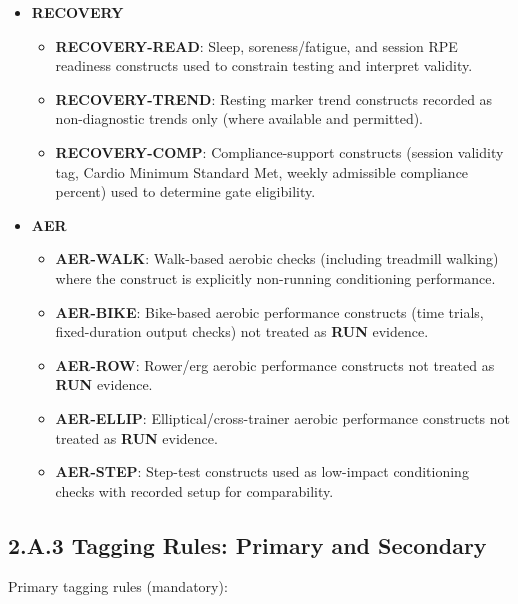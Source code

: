\documentclass[10pt]{article}
\begin{document}
\begin{itemize}
\item \textbf{RECOVERY}

  \begin{itemize}
  \item \textbf{RECOVERY-READ}: Sleep, soreness/fatigue, and session RPE readiness constructs used to constrain testing and interpret validity.
  \item \textbf{RECOVERY-TREND}: Resting marker trend constructs recorded as non-diagnostic trends only (where available and permitted).
  \item \textbf{RECOVERY-COMP}: Compliance-support constructs (session validity tag, Cardio Minimum Standard Met, weekly admissible compliance percent) used to determine gate eligibility.
  \end{itemize}

\item \textbf{AER}

  \begin{itemize}
  \item \textbf{AER-WALK}: Walk-based aerobic checks (including treadmill walking) where the construct is explicitly non-running conditioning performance.
  \item \textbf{AER-BIKE}: Bike-based aerobic performance constructs (time trials, fixed-duration output checks) not treated as \textbf{RUN} evidence.
  \item \textbf{AER-ROW}: Rower/erg aerobic performance constructs not treated as \textbf{RUN} evidence.
  \item \textbf{AER-ELLIP}: Elliptical/cross-trainer aerobic performance constructs not treated as \textbf{RUN} evidence.
  \item \textbf{AER-STEP}: Step-test constructs used as low-impact conditioning checks with recorded setup for comparability.
  \end{itemize}
\end{itemize}

\newpage

\subsection*{2.A.3 Tagging Rules: Primary and Secondary}
{}

Primary tagging rules (mandatory):
\end{document}
